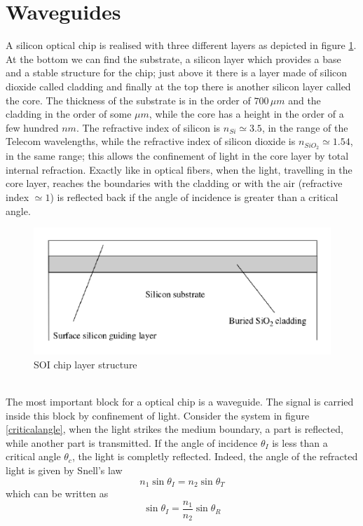 \section{Waveguides}
A silicon optical chip is realised with three different layers as depicted in figure \ref{SOIstructure}. At the bottom we can find the substrate, a silicon layer which provides a base and a stable structure for the chip; just above it there is a layer made of silicon dioxide called cladding and finally at the top there is another silicon layer called the core. The thickness of the substrate is in the order of $700\, \mu m $ and the cladding in the order of some $\mu m$, while the core has a height in the order of a few hundred $nm$. The refractive index of silicon is $n_{Si} \simeq 3.5$, in the range of the Telecom wavelengths, while the refractive index of silicon dioxide is $n_{SiO_2}\simeq 1.54$, in the same range; this allows the confinement of light in the core layer by total internal refraction. Exactly like in optical fibers, when the light, travelling in the core layer, reaches the boundaries with the cladding or with the air (refractive index $\simeq 1$) is reflected back if the angle of incidence is greater than a critical angle. 
\begin{figure}
\centering
\includegraphics[width = .7\textwidth]{img/SOIstructure}
\caption{SOI chip layer structure}
\label{SOIstructure}
\end{figure}
\\The most important block for a optical chip is a waveguide. The signal is carried inside this block by confinement of light. Consider the system in figure \ref{criticalangle}, when the light strikes the medium boundary, a part is reflected, while another part is transmitted. If the angle of incidence $\theta_I$ is less than a critical angle $\theta_c$, the light is completly reflected. Indeed, the angle of the refracted light is given by Snell's law
\begin{equation}n_1 \sin \theta_I = n_2 \sin \theta_T\end{equation}
which can be written as
\begin{equation}\sin \theta_I = \frac{n_1}{n_2}\sin \theta_R\end{equation}
